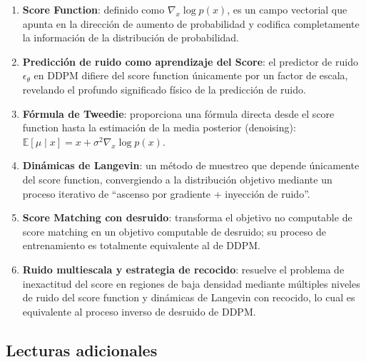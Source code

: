 \documentclass[a4paper]{article}
\begin{document}
\begin{enumerate}
    \item \textbf{Score Function}: definido como $\nabla_x \log p(x)$, es un campo vectorial que apunta en la dirección de aumento de probabilidad y codifica completamente la información de la distribución de probabilidad.

    \item \textbf{Predicción de ruido como aprendizaje del Score}: el predictor de ruido $\epsilon_\theta$ en DDPM difiere del score function únicamente por un factor de escala, revelando el profundo significado físico de la predicción de ruido.

    \item \textbf{Fórmula de Tweedie}: proporciona una fórmula directa desde el score function hasta la estimación de la media posterior (denoising): $\mathbb{E}[\mu \mid x] = x + \sigma^2 \nabla_x \log p(x)$.

    \item \textbf{Dinámicas de Langevin}: un método de muestreo que depende únicamente del score function, convergiendo a la distribución objetivo mediante un proceso iterativo de ``ascenso por gradiente + inyección de ruido''.

    \item \textbf{Score Matching con desruido}: transforma el objetivo no computable de score matching en un objetivo computable de desruido; su proceso de entrenamiento es totalmente equivalente al de DDPM.

    \item \textbf{Ruido multiescala y estrategia de recocido}: resuelve el problema de inexactitud del score en regiones de baja densidad mediante múltiples niveles de ruido del score function y dinámicas de Langevin con recocido, lo cual es equivalente al proceso inverso de desruido de DDPM.
\end{enumerate}

\subsection{Lecturas adicionales}
\end{document}
